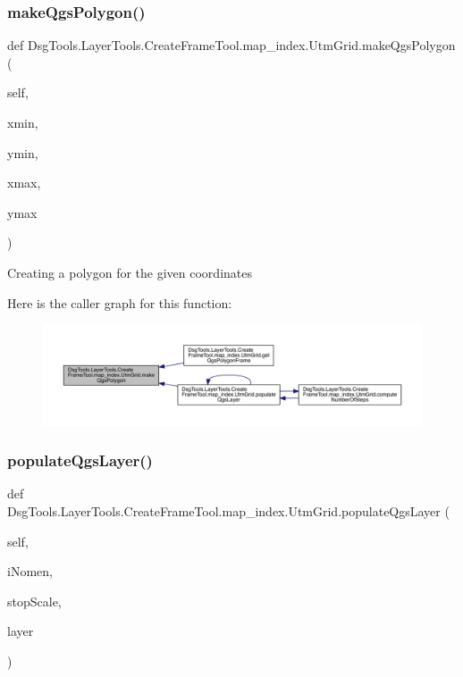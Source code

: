 \subsubsection{\texorpdfstring{make\+Qgs\+Polygon()}{makeQgsPolygon()}}
{\footnotesize\ttfamily def Dsg\+Tools.\+Layer\+Tools.\+Create\+Frame\+Tool.\+map\+\_\+index.\+Utm\+Grid.\+make\+Qgs\+Polygon (\begin{DoxyParamCaption}\item[{}]{self,  }\item[{}]{xmin,  }\item[{}]{ymin,  }\item[{}]{xmax,  }\item[{}]{ymax }\end{DoxyParamCaption})}

\begin{DoxyVerb}Creating a polygon for the given coordinates
\end{DoxyVerb}
 Here is the caller graph for this function\+:
\nopagebreak
\begin{figure}[H]
\begin{center}
\leavevmode
\includegraphics[width=350pt]{class_dsg_tools_1_1_layer_tools_1_1_create_frame_tool_1_1map__index_1_1_utm_grid_ad3d5253b7101efeb9013a23103041c7f_icgraph}
\end{center}
\end{figure}
\mbox{\label{class_dsg_tools_1_1_layer_tools_1_1_create_frame_tool_1_1map__index_1_1_utm_grid_a233e42aa31272b74df7f1ea5a3d2583f}} 
\subsubsection{\texorpdfstring{populate\+Qgs\+Layer()}{populateQgsLayer()}}
{\footnotesize\ttfamily def Dsg\+Tools.\+Layer\+Tools.\+Create\+Frame\+Tool.\+map\+\_\+index.\+Utm\+Grid.\+populate\+Qgs\+Layer (\begin{DoxyParamCaption}\item[{}]{self,  }\item[{}]{i\+Nomen,  }\item[{}]{stop\+Scale,  }\item[{}]{layer }\end{DoxyParamCaption})}

